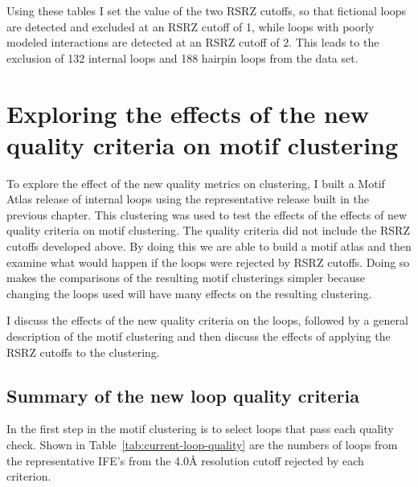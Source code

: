 Using these tables I set the value of the two RSRZ cutoffs, so that fictional
loops are detected and excluded at an RSRZ cutoff of 1, while loops with poorly
modeled interactions are detected at an RSRZ cutoff of 2. This leads to the
exclusion of 132 internal loops and 188 hairpin loops from the data set.

\section{Exploring the effects of the new quality criteria on motif clustering}

To explore the effect of the new quality metrics on clustering, I built a Motif
Atlas release of internal loops using the representative release built in the
previous chapter. This clustering was used to test the effects of the effects of
new quality criteria on motif clustering. The quality criteria did not include
the RSRZ cutoffs developed above. By doing this we are able to build a motif
atlas and then examine what would happen if the loops were rejected by RSRZ
cutoffs. Doing so makes the comparisons of the resulting motif clusterings
simpler because changing the loops used will have many effects on the resulting
clustering.

I discuss the effects of the new quality criteria on the loops, followed by a
general description of the motif clustering and then discuss the effects of
applying the RSRZ cutoffs to the clustering.

\subsection{Summary of the new loop quality criteria}

In the first step in the motif clustering is to select loops that pass each
quality check. Shown in Table~\ref{tab:current-loop-quality} are the numbers of
loops from the representative IFE’s from the 4.0{\AA} resolution cutoff rejected by
each criterion.

